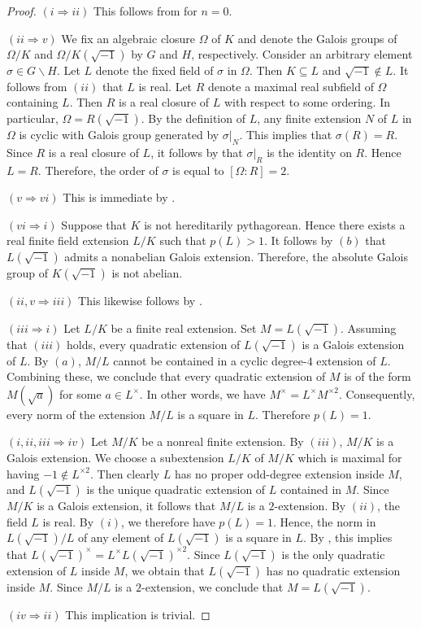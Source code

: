 \documentclass[12pt,leqno]{amsart}
\newcommand{\mg}[1]{#1^{\times}}
\newcommand{\sq}[1]{#1^{\times 2}}
\renewcommand{\setminus}{\smallsetminus}
\numberwithin{equation}{section}
\theoremstyle{definition}
\theoremstyle{plain}
\begin{document}
\begin{proof}
$(i\Rightarrow ii)$
This follows from  for $n=0$. 

$(ii\Rightarrow v)$ 
We fix an algebraic closure $\Omega$ of $K$ and denote the Galois groups of $\Omega/K$ and $\Omega/K(\sqrt{-1})$ by $G$ and $H$, respectively.
Consider an arbitrary element $\sigma\in G\setminus H$.
Let $L$ denote the fixed field of $\sigma$ in $\Omega$.
Then $K\subseteq L$ and $\sqrt{-1}\notin L$. 
It follows from $(ii)$ that $L$ is real.
Let $R$ denote a maximal real subfield of $\Omega$ containing $L$.
Then $R$ is a real closure of $L$ with respect to some ordering.
In particular, $\Omega=R(\sqrt{-1})$.
By the definition of $L$, any finite extension $N$ of $L$ in $\Omega$ is cyclic with Galois group generated by $\sigma|_N$. This implies that $\sigma(R)=R$.
Since $R$ is a real closure of $L$, it follows by \cite[Theorem 1.3.2]{BCR98} that $\sigma|_R$ is the identity on $R$.
Hence $L=R$.
Therefore, the order of $\sigma$ is equal to $[\Omega:R]=2$.

$(v\Rightarrow vi)$ This is immediate by .

$(vi\Rightarrow i)$
Suppose that $K$ is not hereditarily pythagorean. 
Hence there exists a real finite field extension $L/K$ such that $p(L)>1$. 
It follows by  $(b)$ that $L(\sqrt{-1})$ admits a nonabelian Galois extension.
Therefore, the absolute Galois group of $K(\sqrt{-1})$ is not abelian.

$(ii,v\Rightarrow iii)$
This likewise follows by .

$(iii\Rightarrow i)$ 
Let $L/K$ be a finite real extension. 
Set $M=L(\sqrt{-1})$.
Assuming that $(iii)$ holds, every quadratic extension of $L(\sqrt{-1})$ is a Galois extension of $L$.
By  $(a)$, $M/L$ cannot be contained in a cyclic degree-$4$ extension of $L$.
Combining these, we conclude that every quadratic extension of $M$ is of the form $M(\sqrt{a})$ for some $a\in\mg{L}$.
In other words, we have $\mg{M}=\mg{L}\sq{M}$.
Consequently, every norm of the extension $M/L$ is a square in $L$. 
Therefore $p(L)=1$.

$(i,ii,iii\Rightarrow iv)$
Let $M/K$ be a nonreal finite extension.
By $(iii)$, $M/K$ is a Galois extension.
We choose a subextension $L/K$ of $M/K$ which is maximal for having $-1\notin \sq{L}$.
Then clearly $L$ has no proper odd-degree extension inside $M$, and $L(\sqrt{-1})$ is the unique quadratic extension of $L$ contained in $M$.
Since $M/K$ is a Galois extension, 
it follows that $M/L$ is a $2$-extension.
By $(ii)$, the field $L$ is real. By $(i)$, we therefore have $p(L)=1$.
Hence, the norm in $L(\sqrt{-1})/L$ of any element of $L(\sqrt{-1})$ is a square in $L$.
By \cite[Chap.~VII, Theorem 3.8]{Lam05}, this implies that $\mg{L(\sqrt{-1})}=\mg{L}\sq{L(\sqrt{-1})}$.
Since $L(\sqrt{-1})$ is the only quadratic extension of $L$ inside $M$, we obtain that $L(\sqrt{-1})$ has no quadratic extension inside $M$.
Since $M/L$ is a $2$-extension, we conclude that $M=L(\sqrt{-1})$.

$(iv\Rightarrow ii)$ This implication is trivial.
\end{proof}
\end{document}

